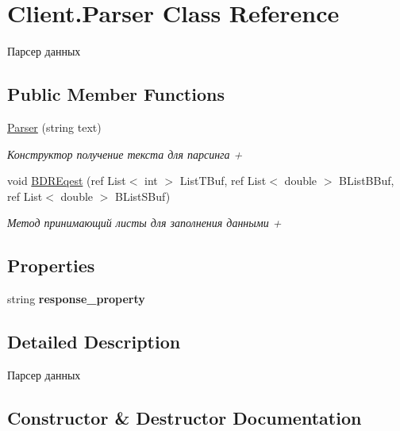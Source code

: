 \hypertarget{class_client_1_1_parser}{}\section{Client.\+Parser Class Reference}
\label{class_client_1_1_parser}


Парсер данных  


\subsection*{Public Member Functions}
\begin{DoxyCompactItemize}
\item 
\hyperlink{class_client_1_1_parser_af6b4d5ec3ebb707244c7dbeaed64b480}{Parser} (string text)
\begin{DoxyCompactList}\small\item\em Конструктор получение текста для парсинга + \end{DoxyCompactList}\item 
void \hyperlink{class_client_1_1_parser_aec40f3563432825f9f6ac93c51e35a40}{B\+D\+R\+Eqest} (ref List$<$ int $>$ List\+T\+Buf, ref List$<$ double $>$ B\+List\+B\+Buf, ref List$<$ double $>$ B\+List\+S\+Buf)
\begin{DoxyCompactList}\small\item\em Метод принимающий листы для заполнения данными + \end{DoxyCompactList}\end{DoxyCompactItemize}
\subsection*{Properties}
\begin{DoxyCompactItemize}
\item 
\hypertarget{class_client_1_1_parser_ae94c8a989af8aad6070e35bf9d9eb613}{}\label{class_client_1_1_parser_ae94c8a989af8aad6070e35bf9d9eb613} 
string {\bfseries response\+\_\+property}
\end{DoxyCompactItemize}


\subsection{Detailed Description}
Парсер данных 



\subsection{Constructor \& Destructor Documentation}
\hypertarget{class_client_1_1_parser_af6b4d5ec3ebb707244c7dbeaed64b480}{}\label{class_client_1_1_parser_af6b4d5ec3ebb707244c7dbeaed64b480} 
